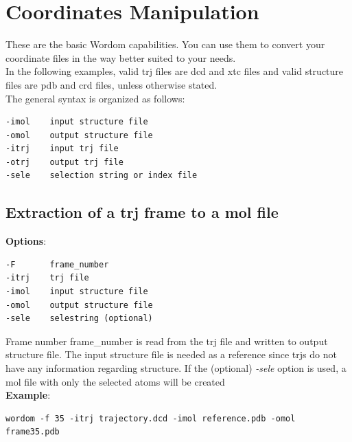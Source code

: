 \documentclass[11pt,twoside,onecolumn,a4paper,openright,notitlepage]{book}[2001/04/21]
\begin{document}


\chapter{Coordinates  Manipulation}

These are the basic Wordom capabilities. You can use them to convert your coordinate files in the way better suited to your needs.\\
In the following examples, valid trj files are dcd and xtc files and valid structure files are pdb and crd files, unless otherwise stated.\\
The general syntax is organized as follows:
\begin{verbatim}
-imol    input structure file
-omol    output structure file
-itrj    input trj file
-otrj    output trj file
-sele    selection string or index file
\end{verbatim}

\section{Extraction of a trj frame to a mol file}
\textbf{\large Options}:
\begin{verbatim}
-F       frame_number
-itrj    trj file
-imol    input structure file
-omol    output structure file
-sele    selestring (optional)
\end{verbatim}
Frame number frame\_number is read from the trj file and written to output structure file. The input structure file is needed as a reference since trjs do not have any information regarding structure. If the (optional) \emph{-sele} option is used, a mol file with only the selected atoms will be created\\

\textbf{\large Example}:
\begin{verbatim}
wordom -f 35 -itrj trajectory.dcd -imol reference.pdb -omol frame35.pdb
\end{verbatim}
%
\end{document}
